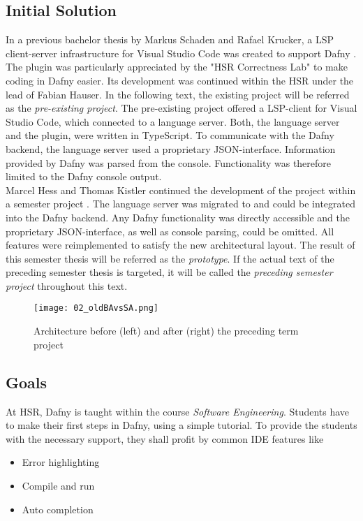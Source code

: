 \subsection{Initial Solution}
\label{section:introduction:initialsolution}
In a previous bachelor thesis by Markus Schaden and Rafael Krucker, a LSP client-server infrastructure for Visual Studio Code was created to support Dafny \cite{ba}.
The plugin was particularly appreciated by the "HSR Correctness Lab" \cite{correctnessLab} to make coding in Dafny easier.
Its development was continued within the HSR under the lead of Fabian Hauser.
In the following text, the existing project will be referred as the \textit{pre-existing project}.
The pre-existing project offered a LSP-client for Visual Studio Code, which connected to a language server.
Both, the language server and the plugin, were written in TypeScript.
To communicate with the Dafny backend, the language server used a proprietary JSON-interface.
Information provided by Dafny was parsed from the console.
Functionality was therefore limited to the Dafny console output.\\

Marcel Hess and Thomas Kistler continued the development of the project within a semester project \cite{sa}.
The language server was migrated to \CsharpWithSpace and could be integrated into the Dafny backend.
Any Dafny functionality was directly accessible and the proprietary JSON-interface, as well as console parsing, could be omitted.
All features were reimplemented to satisfy the new architectural layout.
The result of this semester thesis will be referred as the \textit{prototype}.
If the actual text of the preceding semester thesis is targeted, it will be called the \textit{preceding semester project} throughout this text.

\begin{figure}[ht]
    \centering
    \texttt{[image: 02\_oldBAvsSA.png]}
    \caption{Architecture before (left) and after (right) the preceding term project}
    \label{fig:oldBAvsSA}
\end{figure}


\subsection{Goals}
At HSR, Dafny is taught within the course \textit{Software Engineering}.
Students have to make their first steps in Dafny, using a simple tutorial.
To provide the students with the necessary support, they shall profit by common IDE features like
\begin{itemize}
    \item Error highlighting
    \item Compile and run
    \item Auto completion
\end{itemize}

